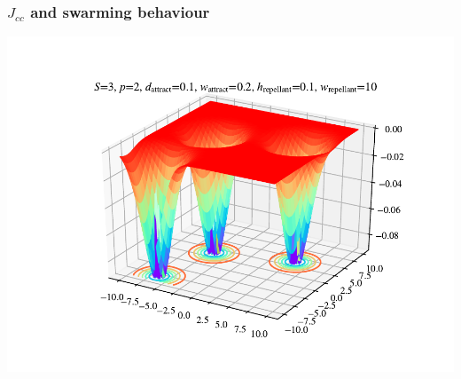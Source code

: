 \documentclass{beamer}
\begin{document}
\begin{frame}
\frametitle{$J_{cc}$ and swarming behaviour}
\begin{center}
\includegraphics[scale=0.5]{assets/swarming}
\end{center}
\end{frame}

\end{document}
